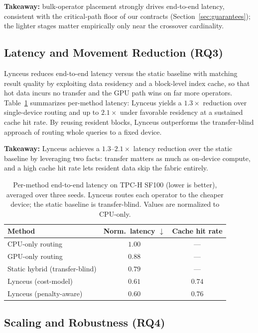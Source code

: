 \documentclass{article}
\begin{document}
\textbf{Takeaway:} bulk-operator placement strongly drives end-to-end latency,
consistent with the critical-path floor of our contracts
(Section~\ref{sec:guarantees}); the lighter stages matter empirically only near
the crossover cardinality.

\subsection{Latency and Movement Reduction (RQ3)}
\label{sec:rq3}

Lynceus reduces end-to-end latency versus the static baseline with matching
result quality by exploiting data residency and a block-level index cache, so
that hot data incurs no transfer and the GPU path wins on far more operators.
Table~\ref{tab:latency} summarizes per-method latency: Lynceus yields a
$1.3\times$ reduction over single-device routing and up to $2.1\times$ under
favorable residency at a sustained cache hit rate. By reusing resident blocks,
Lynceus outperforms the transfer-blind approach of routing whole queries to a
fixed device.

\textbf{Takeaway:} Lynceus achieves a $1.3$--$2.1\times$ latency reduction over
the static baseline by leveraging two facts: transfer matters as much as
on-device compute, and a high cache hit rate lets resident data skip the fabric
entirely.

\begin{table}[t]
\centering
\caption{Per-method end-to-end latency on TPC-H SF100 (lower is better), averaged
over three seeds. Lynceus routes each operator to the cheaper device; the static
baseline is transfer-blind. Values are normalized to CPU-only.}
\label{tab:latency}
\begin{tabular}{lcc}
\toprule
Method & Norm.\ latency $\downarrow$ & Cache hit rate \\
\midrule
CPU-only routing            & $1.00$ & --- \\
GPU-only routing            & $0.88$ & --- \\
Static hybrid (transfer-blind) & $0.79$ & --- \\
Lynceus (cost-model)        & $0.61$ & $0.74$ \\
Lynceus (penalty-aware)     & $0.60$ & $0.76$ \\
\bottomrule
\end{tabular}
\end{table}

\subsection{Scaling and Robustness (RQ4)}
\label{sec:rq4}
\end{document}
